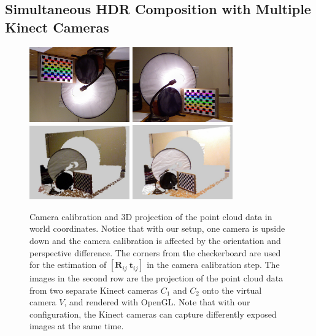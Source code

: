 \subsection{Simultaneous HDR Composition with Multiple Kinect Cameras}

\begin{figure}
\centering
\includegraphics[width=1.7in]{ch4/diagrams/corners01.jpg} 
\includegraphics[width=1.7in]{ch4/diagrams/corners02.jpg} \\
\includegraphics[width=1.7in]{ch4/diagrams/calibration_camera1.jpg} 
\includegraphics[width=1.7in]{ch4/diagrams/calibration_camera2.jpg} \\
\caption{Camera calibration and 3D projection of the point cloud data in world coordinates. Notice that with our setup, one camera is upside down and the camera calibration is affected by the orientation and perspective difference. The corners from the checkerboard are used for the estimation of $[\mathbf{R}_{ij}~\mathbf{t}_{ij}]$ in the camera calibration step. The images in the second row are the projection of the point cloud data from two separate Kinect cameras $C_{1}$ and $C_{2}$ onto the virtual camera $V$, and rendered with OpenGL. Note that with our configuration, the Kinect cameras can capture differently exposed images at the same time.}
\label{fig_reproject}
\label{sec_sim_hdr_mul_kinect}
\end{figure}

